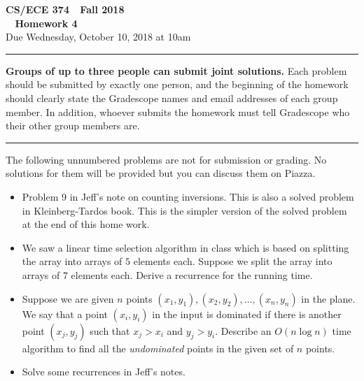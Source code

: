 \documentclass[11pt]{article}
\begin{document}

\thispagestyle{empty}

\begin{center}
\Large\textbf{CS/ECE 374 \,\decosix\,  Fall 2018}%
\\
\LARGE\textbf{\decothreeleft~ Homework 4 ~\decothreeright}%
\\[0.5ex]
\large Due Wednesday, October 10, 2018 at 10am
\end{center}

\bigskip
\hrule
\bigskip

\noindent
\textbf{Groups of up to three people can submit joint solutions.}
Each problem should be submitted by exactly one person, and the
beginning of the homework should clearly state the Gradescope names
and email addresses of each group member.  In addition, whoever
submits the homework must tell Gradescope who their other group
members are.
\bigskip \hrule \bigskip

\noindent
The following unnumbered problems are not for submission or grading.
No solutions for them will be provided but you can discuss them on Piazza.
\begin{itemize}
\item Problem 9 in Jeff's note on counting inversions. This is also a solved
problem in Kleinberg-Tardos book. This is the simpler version of the
solved problem at the end of this home work.
\item We saw a linear time selection algorithm in class which is based
  on splitting the array into arrays of $5$ elements each. Suppose we
  split the array into arrays of $7$ elements each. Derive a
  recurrence for the running time.
\item Suppose we are given $n$ points $(x_1,y_1), (x_2,y_2),\ldots,(x_n,y_n)$
  in the plane. We say that a point $(x_i,y_i)$ in the input is
  dominated if there is another point $(x_j,y_j)$ such that $x_j > x_i$
  and $y_j > y_i$. Describe an $O(n \log n)$ time algorithm to find
  all the {\em undominated} points in the given set of $n$ points.
\item Solve some recurrences in Jeff's notes.
\end{itemize}

\vspace{1cm}
\end{document}
